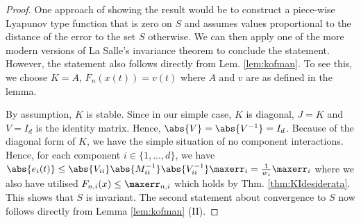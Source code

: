 \begin{proof}
One approach of showing the result would be to construct a piece-wise Lyapunov type function that is zero on $S$ and assumes values proportional to the distance of the error to the set $S$ otherwise. We can then apply one of the more modern versions of La Salle's invariance theorem \cite{Bhat2009,Haddad2008} to conclude the statement.
However, the statement also follows directly from Lem. \ref{lem:kofman}. To see this, we choose $K =A$, $F_n(x(t)) = v(t)$ where $A$ and $v$ are as defined in the lemma. 


By assumption, $K$ is stable. Since in our simple case, $K$ is diagonal, $J = K$ and $V = I_d$ is the identity matrix. Hence, $\abs{V}=\abs{V^{-1}} =I_d$. Because of the diagonal form of $K$, we have the simple situation of no component interactions. Hence, for each component $i \in \{1,...,d\}$, we have 
$\abs{e_i(t)} \leq \abs{V_{ii}} \abs{M_{ii}^{-1}} \abs{V_{ii}^{-1}} \maxerr_i= \frac{1}{w_i} \maxerr_i$ where we also have utilised $F_{n,i}(x) \leq \maxerr_{n,i}$ which holds by Thm. \ref{thm:KIdesiderata}.
This shows that $S$ is invariant.
The second statement about convergence to $S$ now follows directly from Lemma \ref{lem:kofman} (II).
%
%
%
%
%
%
%
%
%
\end{proof} 


